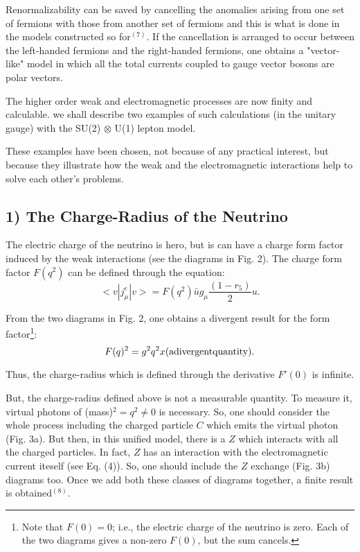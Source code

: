 Renormalizability can be saved by cancelling the anomalies arising from one set of fermions with those from another set of fermions and this is what is done in the models constructed so for$^{(7)}$. If the cancellation is arranged to occur between the left-handed fermions and the right-handed fermions, one obtains a "vector-like" model in which all the total currents coupled to gauge vector bosons are polar vectors.

The higher order weak and electromagnetic processes are now finity and calculable. we shall describe two examples of such calculations (in the unitary gauge) with the SU(2) $\otimes$ U(1) lepton model. 

These examples have been chosen, not because of any practical interest, but because they illustrate how the weak and the electromagnetic interactions help to solve each other's problems.

\subsection*{1) The Charge-Radius of the Neutrino}

The electric charge of the neutrino is hero, but is can have a charge form factor induced by the weak interactions (see the diagrams in Fig. 2). The charge form factor $F(q^{2})$ can be defined through the equation:
$$
<v | j^{e}_{\mu} | v> = F(q^{2}) \bar{u}g_{\mu} \frac{(1-r_{5})}{2} u.
$$

From the two diagrams in Fig. 2, one obtains a divergent result for the form factor\footnote{Note that $F(0)=0$; i.e., the electric charge of the neutrino is zero. Each of the two diagrams gives a non-zero $F(0)$, but the sum cancels.}:
$$
F(q)^{2} =g^{2} q^{2} x (\rm a divergent quantity).
$$

Thus, the charge-radius which is defined through the derivative $F'(0)$ is infinite.

But, the charge-radius defined above is not a measurable quantity. To measure it, virtual photons of (mass)$^{2}= q^{2} \neq 0$ is necessary. So, one should consider the whole process including the charged particle $C$ which emits the virtual photon (Fig. 3a). But then, in this unified model, there is a $Z$ which interacts with all the charged particles. In fact, $Z$ has an interaction with the electromagnetic current iteself (see Eq. (4)). So, one should include the $Z$ exchange (Fig. 3b) diagrams too. Once we add both these classes of diagrams together, a finite result is obtained$^{(8)}$.


